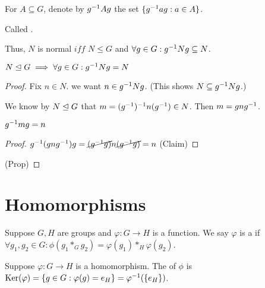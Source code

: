 \documentclass[notes.tex]{subfiles}
\begin{document}
\begin{defn}
	For $A\subseteq G$, denote by ${g}^{-1}Ag$ the set $\{{g}^{-1}ag : a\in A\}$.

	Called .
\end{defn}

\begin{remark}
	Thus, $N$ is normal $iff$ $N\le G$ and $\forall g\in G: {g}^{-1}Ng \subseteq N$.
\end{remark}

\begin{proposition}
	$N\trianglelefteq G \implies \forall g\in G: {g}^{-1}Ng=N$
\end{proposition}
\begin{proof}
	Fix $n\in N$. we want $n\in {g}^{-1}Ng$. (This shows $N\subseteq{g}^{-1}Ng$.)

	We know by $N\trianglelefteq G$ that $m =({g}^{-1})^{-1}n({g}^{-1})\in N$.
	Then $m=gn{g}^{-1}$.
	\begin{claim}
		${g}^{-1}mg=n$
	\end{claim}
	\begin{proof}
		${g}^{-1}(gn{g}^{-1})g=\cancel{({g}^{-1}g)}n\cancel{({g}^{-1}g)} = n$
		\qedhere(Claim)
	\end{proof}
	\qedhere(Prop)
\end{proof}


\chapter*{Homomorphisms}
\begin{defn}
	Suppose $G, H$ are groups and $\varphi:G\to H$ is a function.
	We say $\varphi$ is a  if $\forall g_1, g_2\in G: \phi(g_1 *_G g_2) = \varphi(g_1) *_H \varphi(g_2)$.
\end{defn}

\begin{defn}
	Suppose $\varphi:G\to H$ is a homomorphism. The  of $\phi$ is $\operatorname{\mathrm{Ker}}(\varphi) = \{g\in G : \varphi(g) = e_H\} = \varphi^{-1}(\{e_H\})$.
\end{defn}
\end{document}
